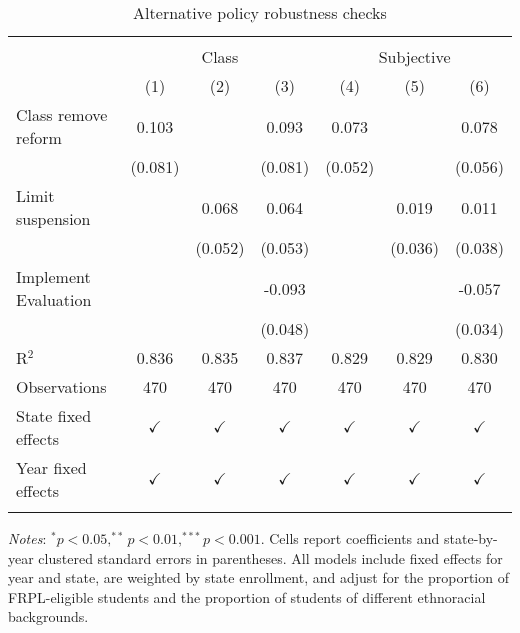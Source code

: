 
\begin{table}[!htbp]
   \caption{\label{tab:alt} Alternative policy robustness checks}
   \bigskip
   \centering
   \begin{tabular}{lcccccc}
      \hline \hline \\[-1.8ex]
       & \multicolumn{3}{c}{Class} & \multicolumn{3}{c}{Subjective}\\
                           & (1)           & (2)           & (3)           & (4)           & (5)           & (6)\\  
      \midrule 
      Class remove reform  & 0.103         &               & 0.093         & 0.073         &               & 0.078\\   
                           & (0.081)       &               & (0.081)       & (0.052)       &               & (0.056)\\   
      Limit suspension     &               & 0.068         & 0.064         &               & 0.019         & 0.011\\   
                           &               & (0.052)       & (0.053)       &               & (0.036)       & (0.038)\\   
      Implement Evaluation &               &               & -0.093        &               &               & -0.057\\   
                           &               &               & (0.048)       &               &               & (0.034)\\   
       \midrule
      R$^2$                & 0.836         & 0.835         & 0.837         & 0.829         & 0.829         & 0.830\\  
      Observations         & 470           & 470           & 470           & 470           & 470           & 470\\  
       \midrule
      State fixed effects  & $\checkmark$  & $\checkmark$  & $\checkmark$  & $\checkmark$  & $\checkmark$  & $\checkmark$\\   
      Year fixed effects   & $\checkmark$  & $\checkmark$  & $\checkmark$  & $\checkmark$  & $\checkmark$  & $\checkmark$\\   
      \hline \hline \\[-1.8ex]
   \end{tabular}
   
   \par \justifying 
   \small \textit{Notes}: $^{*}p<0.05, ^{**}p<0.01, ^{***}p<0.001$. Cells report coefficients and state-by-year clustered standard errors in parentheses. All models include fixed effects for year and state, are weighted by state enrollment, and adjust for the proportion of FRPL-eligible students and the proportion of students of different ethnoracial backgrounds.
\end{table}


